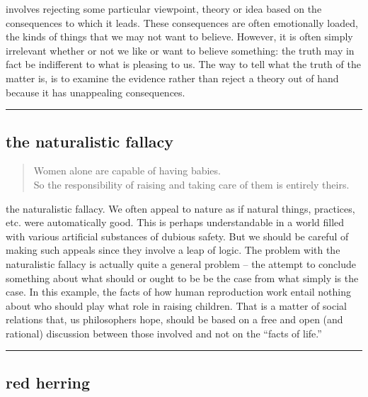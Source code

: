 \documentclass[justified]{tufte-book}
\newenvironment{argument}{\begin{quote}\normalsize}{\end{quote}}
\begin{document}
 involves rejecting some particular viewpoint, theory or idea based on the consequences to which it leads. These consequences are often emotionally loaded, the kinds of things that we may not want to believe. However, it is often simply irrelevant whether or not we like or want to believe something: the truth may in fact be indifferent to what is pleasing to us. The way to tell what the truth of the matter is, is to examine the evidence rather than reject a theory out of hand because it has unappealing consequences.

\begin{center}\rule{0.5\linewidth}{\linethickness}\end{center}

\hypertarget{the-naturalistic-fallacy}{%
\subsection*{the naturalistic fallacy}\label{the-naturalistic-fallacy}}

\begin{argument}
Women alone are capable of having babies.\\
So the responsibility of raising and taking care of them is entirely
theirs.
\end{argument}

 the naturalistic fallacy. We often appeal to nature as if natural things, practices, etc. were automatically good. This is perhaps understandable in a world filled with various artificial substances of dubious safety. But we should be careful of making such appeals since they involve a leap of logic. The problem with the naturalistic fallacy is actually quite a general problem -- the attempt to conclude something about what should or ought to be be the case from what simply is the case. In this example, the facts of how human reproduction work entail nothing about who should play what role in raising children. That is a matter of social relations that, us philosophers hope, should be based on a free and open (and rational) discussion between those involved and not on the ``facts of life.''

\begin{center}\rule{0.5\linewidth}{\linethickness}\end{center}

\hypertarget{red-herring}{%
\subsection*{red herring}\label{red-herring}}
\end{document}
